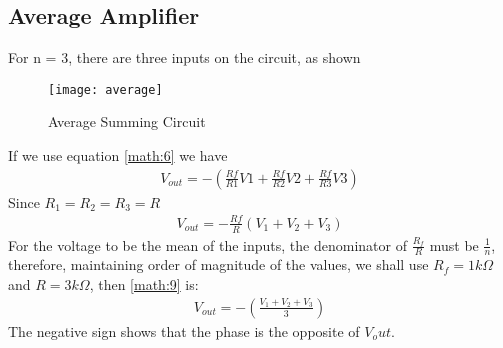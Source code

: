 \documentclass[journal]{IEEEtran}
\begin{document}
        \subsection{Average Amplifier}
            For n = 3, there are three inputs on the circuit, as shown\\
            \begin{figure}[h]
                \centering
                \texttt{[image: average]}
                \caption{Average Summing Circuit}
                \label{fig:average}
            \end{figure}
            \par If we use equation \ref{math:6} we have
            \begin{align}
                V_{out} = -(\frac{Rf}{R1}V1 + \frac{Rf}{R2}V2 + \frac{Rf}{R3}V3) \label{math:8}
            \end{align}
            Since $R_1 = R_2 = R_3 = R$
            \begin{align}
                V_{out} = -\frac{Rf}{R} (V_1 + V_2 + V_3) \label{math:9}
            \end{align}
            For the voltage to be the mean of the inputs, the denominator of $\frac{R_f}{R}$ must be $\frac{1}{n}$, therefore, maintaining order of magnitude of the values, we shall use $R_f = 1k\Omega$ and $R = 3k\Omega$, then \ref{math:9} is:
            \begin{align}
                V_{out} = -(\frac{V_1 + V_2 + V_3}{3}) \label{math:10}
            \end{align}
            The negative sign shows that the phase is the opposite of $V_out$.
\end{document}
